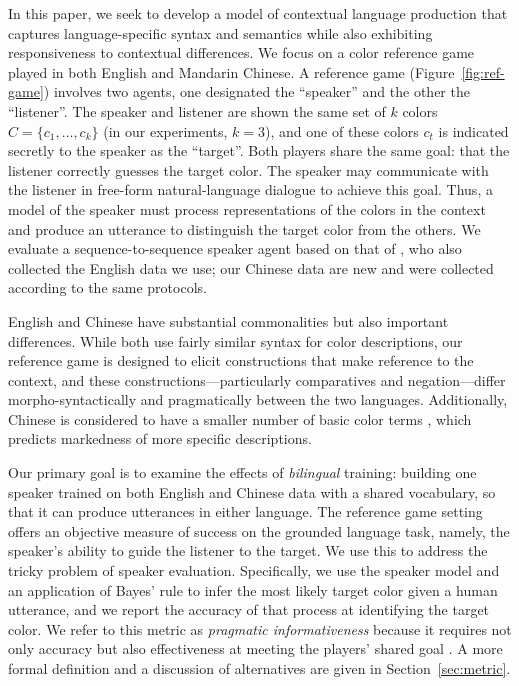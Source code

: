 \documentclass[11pt,a4paper]{article}
\renewcommand{\|}{\mid}
\newcommand{\figref}[1]{Figure~\ref{#1}}
\newcommand{\secref}[1]{Section~\ref{#1}}
\begin{document}
In this paper, we seek to develop a model of contextual language production that captures language-specific syntax and semantics while also exhibiting responsiveness to contextual differences. We focus on a color reference game \citep{Rosenberg:Cohen:1964,Dale:Reiter:1995,Krahmer:vanDeemter:2012}
played in both English and Mandarin Chinese.
A reference game (\figref{fig:ref-game}) involves two agents, one designated the ``speaker'' and the other the ``listener''. The
speaker and listener are shown the same set of $k$ colors $C = \{c_1, \dotsc, c_k\}$ (in our experiments, 
$k = 3$), and one of these
colors $c_t$ is indicated secretly to the speaker as the ``target''. Both players share the same goal:
that the listener correctly guesses the target color. The speaker may communicate with the listener in
free-form natural-language dialogue to achieve this goal. Thus, a model of the speaker must process representations of the colors in the context and produce an utterance to distinguish the target color from the others. We evaluate a sequence-to-sequence speaker agent based on that of \citet{Monroe2017}, who also collected the English data we use; our Chinese data are new and were collected according to the same protocols.

English and Chinese have substantial commonalities but also important differences. While both use fairly similar syntax for color descriptions, our reference game is designed to elicit constructions that make reference to the context, and these constructions---particularly comparatives and negation---differ morpho-syntactically and pragmatically between the two languages. Additionally, Chinese is considered to have a smaller number of basic color terms \citep{BerlinKay1969}, which predicts markedness of more specific descriptions. %

Our primary goal is to examine the effects of \emph{bilingual} training: building one speaker trained on both English and Chinese data with a shared vocabulary, so that it can produce utterances in either language.  
The reference game setting offers an objective measure of success on the grounded
language task, namely, the speaker's ability to guide the listener to the target. We use this to address the tricky problem of speaker evaluation. Specifically, we use the speaker model and an application of Bayes' rule to infer the most likely target color given a human utterance, and we report the accuracy of that process at identifying the target color. We refer to this metric as \emph{pragmatic informativeness} because it requires not only accuracy but also effectiveness at meeting the players' shared goal \citep{Grice75}. 
%
A more formal definition and a discussion of alternatives are given in \secref{sec:metric}.
\end{document}
